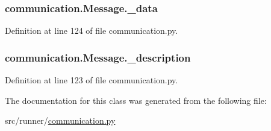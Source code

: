 \subsubsection[{\+\_\+data}]{\setlength{\rightskip}{0pt plus 5cm}communication.\+Message.\+\_\+data\hspace{0.3cm}{\ttfamily [private]}}\label{classcommunication_1_1Message_a8fe4f1f09629c4edf328939167b1892c}


Definition at line 124 of file communication.\+py.

\hypertarget{classcommunication_1_1Message_ad840c310a6e64814c848d98bfc29da36}{}
\subsubsection[{\+\_\+description}]{\setlength{\rightskip}{0pt plus 5cm}communication.\+Message.\+\_\+description\hspace{0.3cm}{\ttfamily [private]}}\label{classcommunication_1_1Message_ad840c310a6e64814c848d98bfc29da36}


Definition at line 123 of file communication.\+py.



The documentation for this class was generated from the following file\+:\begin{DoxyCompactItemize}
\item 
src/runner/\hyperlink{communication_8py}{communication.\+py}\end{DoxyCompactItemize}
